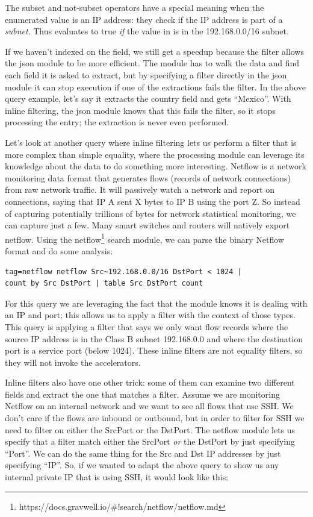 The subset and not-subset operators have a special meaning when the enumerated value is an IP address: they check if the IP address is part of a \emph{subnet}. Thus  evaluates to true \emph{if} the value in  is in the 192.168.0.0/16 subnet.

If we haven't indexed on the  field, we still get a speedup
because the filter allows the json module to be more efficient. The
 module has to walk the data and find each field it is asked to
extract, but by specifying a filter directly in the json module it can
stop execution if one of the extractions fails the filter. In the above
query example, let's say it extracts the country field and gets ``Mexico''.
With inline filtering, the json module knows that this fails the
filter, so it stops processing the entry; the  extraction is
never even performed.

Let's look at another query where inline
filtering lets us perform a filter that is more complex than simple
equality, where the processing module can leverage its knowledge about
the data to do something more interesting. Netflow is a network monitoring data format that generates flows
(records of network connections) from raw network traffic. It will passively watch a network and report on connections, saying that
IP A sent X bytes to IP B using the port Z. So instead of capturing
potentially trillions of bytes for network statistical monitoring, we can
capture just a few. Many smart switches and routers will natively
export netflow.
Using the netflow\footnote{https://docs.gravwell.io/\#!search/netflow/netflow.md} search
module, we can parse the binary Netflow format and do some analysis:

\begin{Verbatim}[breaklines=true]
tag=netflow netflow Src~192.168.0.0/16 DstPort < 1024 |
count by Src DstPort | table Src DstPort count
\end{Verbatim}

For this query we are leveraging the fact that the  module
knows it is dealing with an IP and port; this allows us to apply a
filter with the context of those types. This query is applying a filter
that says we only want flow records where the source IP address is in
the Class B subnet 192.168.0.0 and where the destination port is a
service port (below 1024). These inline filters are not equality
filters, so they will not invoke the accelerators.

Inline filters also have one other trick: some of them can examine two
different fields and extract the one that matches a filter. Assume we
are monitoring Netflow on an internal network and we want to see all
flows that use SSH. We don't care if the flows are inbound or outbound,
but in order to filter for SSH we need to filter on either the SrcPort
or the DstPort. The netflow module lets us specify that a filter match
either the SrcPort \emph{or} the DstPort by just specifying ``Port''. We can do the
same thing for the Src and Dst IP addresses by just specifying ``IP''. So, if we wanted to adapt
the above query to show us any internal private IP that is using
SSH, it would look like this:

